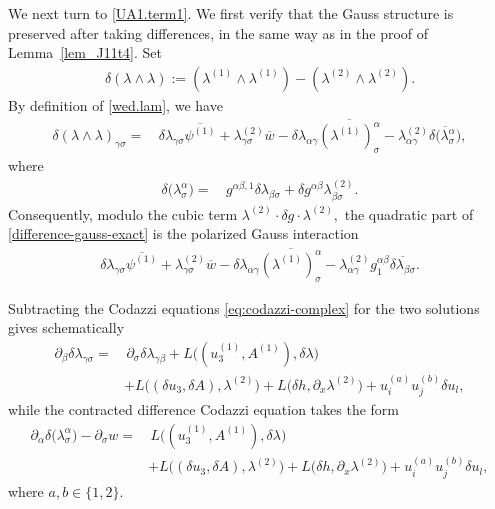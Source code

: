 \documentclass[11pt,letterpaper,reqno]{amsart}
\numberwithin{equation}{section}
\theoremstyle{definition}
\theoremstyle{remark}
\begin{document}
We next turn to \eqref{UA1.term1}. We first verify that the Gauss structure
is preserved after taking differences, in the same way as in the proof of
Lemma~\ref{lem_J11t4}. Set
\begin{align}
\delta(\lambda\wedge\lambda)
:=
(\lambda^{(1)}\wedge\lambda^{(1)})
-
(\lambda^{(2)}\wedge\lambda^{(2)}).
\label{def:difference-gauss}
\end{align}
By definition of \eqref{wed.lam}, we have
\begin{align}
\delta(\lambda\wedge\lambda)_{\gamma\sigma}
=&\,
\delta\lambda_{\gamma\sigma}
\overline{\psi^{(1)}}
+
\lambda_{\gamma\sigma}^{(2)}
\overline{w}
 -
\delta\lambda_{\alpha\gamma}
\overline{(\lambda^{(1)})^\alpha_\sigma}
-
\lambda_{\alpha\gamma}^{(2)}
\overline{
\delta\bigl(\lambda^\alpha_\sigma\bigr)
},
\label{difference-gauss-exact}
\end{align}
where
\begin{align}
\delta\bigl(\lambda^\alpha_\sigma\bigr)
=&\,
g^{\alpha\beta,1}\delta\lambda_{\beta\sigma}
+
\delta g^{\alpha\beta}\lambda_{\beta\sigma}^{(2)}.
\label{difference-raised-lambda}
\end{align}
Consequently, modulo the cubic term
\(
\lambda^{(2)}\cdot\delta g\cdot\lambda^{(2)},
\)
the quadratic part of \eqref{difference-gauss-exact} is the polarized
Gauss interaction
\begin{align*}
\delta\lambda_{\gamma\sigma}
\overline{\psi^{(1)}}
+
\lambda_{\gamma\sigma}^{(2)}
\overline{w}
-
\delta\lambda_{\alpha\gamma}
\overline{(\lambda^{(1)})^\alpha_\sigma}
-
\lambda_{\alpha\gamma}^{(2)}
g_1^{\alpha\beta}
\overline{\delta\lambda_{\beta\sigma}}.
\end{align*}

Subtracting the Codazzi equations  \eqref{eq:codazzi-complex} for the two solutions gives
schematically
\begin{align}
\partial_\beta\delta\lambda_{\gamma\sigma}
=&\,
\partial_\sigma\delta\lambda_{\gamma\beta}
+
L\bigl((u_3^{(1)},A^{(1)}),\delta\lambda\bigr)
\label{difference-codazzi} \\
&+
L\bigl((\delta u_3,\delta A),\lambda^{(2)}\bigr)
+
L\bigl(\delta h,\partial_x\lambda^{(2)}\bigr)
+
u_i^{(a)}u_j^{(b)}\delta u_l, \nonumber
\end{align}
while the contracted difference Codazzi equation takes the form
\begin{align}
\partial_\alpha
\delta\bigl(\lambda^\alpha_\sigma\bigr)
-
\partial_\sigma w
=&\,
L\bigl((u_3^{(1)},A^{(1)}),\delta\lambda\bigr)
\label{difference-contracted-codazzi}\\
&+
L\bigl((\delta u_3,\delta A),\lambda^{(2)}\bigr)
+
L\bigl(\delta h,\partial_x\lambda^{(2)}\bigr)
+
u_i^{(a)}u_j^{(b)}\delta u_l, \nonumber
\end{align}
where \(a,b \in \{1,2\}\).
\end{document}
